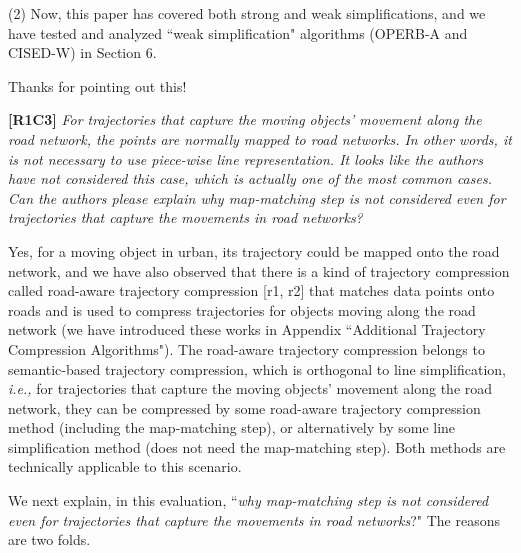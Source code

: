 \documentclass{letter}
\newcommand{\ie}{\emph{i.e.,}\xspace}
\begin{document}
(2) Now, this paper has covered both strong and weak simplifications, and we have tested and analyzed ``weak simplification" algorithms (OPERB-A and CISED-W) in Section 6. 

Thanks for pointing out this!

\textbf{[R1C3]} \emph{For trajectories that capture the moving objects' movement along the road network, the points are normally mapped to road networks. In other words, it is not necessary to use piece-wise line representation. It looks like the authors have not considered this case, which is actually one of the most common cases. Can the authors please explain why map-matching step is not considered even for trajectories that capture the movements in road networks?}

Yes, for a moving object in urban, its trajectory could be mapped onto the road network, and we have also observed that there is a kind of trajectory compression called road-aware trajectory compression [r1, r2] that matches data points onto roads and is used to compress trajectories for objects moving along the road network (we have introduced these works in Appendix ``Additional Trajectory Compression Algorithms"). The road-aware trajectory compression belongs to semantic-based trajectory compression, which is orthogonal to line simplification, \ie for trajectories that capture the moving objects' movement along the road network, they can be compressed by some road-aware trajectory compression method (including the map-matching step), or alternatively by some line simplification method (does not need the map-matching step). Both methods are technically applicable to this scenario. 


We next explain, in this evaluation, ``\emph{why map-matching step is not considered even for trajectories that capture the movements in road networks}?"
The reasons are two folds.
\end{document}
